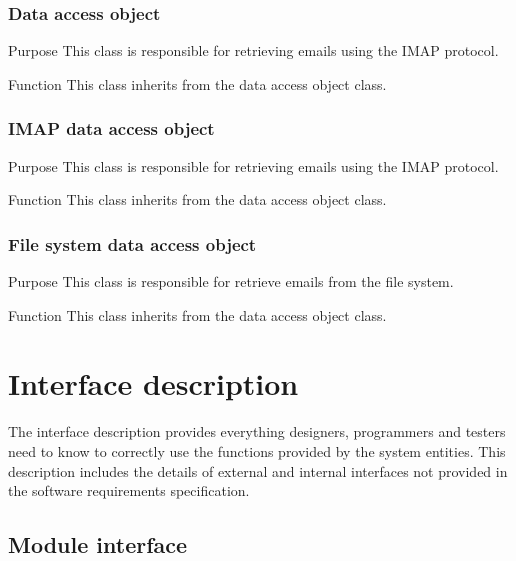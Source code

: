 \documentclass[12pt]{article}
\newenvironment{my_desc}
{\begin{description}
  \setlength{\itemsep}{0cm}
  \setlength{\parskip}{0cm}}
{\end{description}}
\begin{document}
\subsubsection{Data access object}
  \begin{my_desc}
   \item[Purpose] This class is responsible for retrieving emails using the IMAP protocol.
   \item[Function] This class inherits from the data access object class.
  \end{my_desc}

\subsubsection{IMAP data access object}
  \begin{my_desc}
   \item[Purpose] This class is responsible for retrieving emails using the IMAP protocol.
   \item[Function] This class inherits from the data access object class.
  \end{my_desc}


\subsubsection{File system data access object}
  \begin{my_desc}
   \item[Purpose] This class is responsible for retrieve emails from the file system.
   \item[Function] This class inherits from the data access object class.
  \end{my_desc}


\section{Interface description}
The interface description provides everything designers, programmers and testers need to know to correctly use the functions provided by the system entities. This description includes the details of external and internal interfaces not provided in the software requirements speciﬁcation.

\subsection{Module interface}
\end{document}
